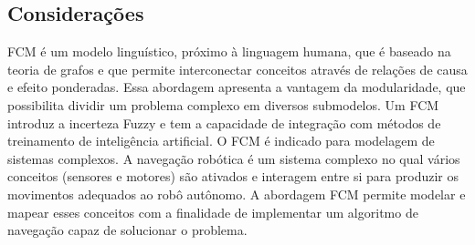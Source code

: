 \subsection{Considerações}
FCM é um modelo linguístico, próximo à linguagem humana, que é baseado na teoria de grafos e que permite interconectar conceitos através de relações de causa e efeito ponderadas. Essa abordagem apresenta a vantagem da modularidade, que possibilita dividir um problema complexo em diversos submodelos. Um FCM introduz a incerteza Fuzzy e tem a capacidade de integração com métodos de treinamento de inteligência artificial. O FCM é indicado para modelagem de sistemas complexos. A navegação robótica é um sistema complexo no qual vários conceitos (sensores e motores) são ativados e interagem entre si para produzir os movimentos adequados ao robô autônomo. A abordagem FCM permite modelar e mapear esses conceitos com a finalidade de implementar um algoritmo de navegação capaz de solucionar o problema.

